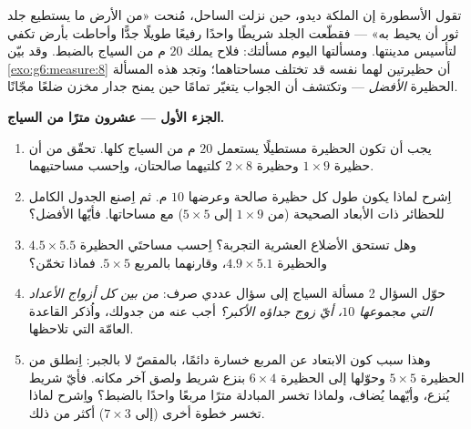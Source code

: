 \begin{problem}
\label{pb:g6:measure:1}
تقول الأسطورة إن الملكة ديدو، حين نزلت الساحل، مُنحت
«من الأرض ما يستطيع جلد ثور أن يحيط به» --- فقطّعت
الجلد شريطًا واحدًا رفيعًا طويلًا جدًّا وأحاطت بأرض
تكفي لتأسيس مدينتها. ومسألتها اليوم مسألتك: فلاح
يملك $20$ م من السياج بالضبط. وقد بيّن \cref{exo:g6:measure:8}
أن حظيرتين لهما  نفسه قد تختلف
مساحتاهما؛ وتجد هذه المسألة الحظيرة \emph{الأفضل} --- وتكتشف
أن الجواب يتغيّر تمامًا حين يمنح جدار مخزن ضلعًا
مجّانًا.

\medskip
\noindent\textbf{الجزء الأول --- عشرون مترًا من السياج.}
\begin{enumerate}
  \item يجب أن تكون الحظيرة مستطيلًا يستعمل $20$ م من السياج كلها.
        تحقّق من أن حظيرة $1 \times 9$ وحظيرة $2 \times 8$ كلتيهما
        صالحتان، واِحسب مساحتيهما.
  \item اِشرح لماذا يكون  طول كل حظيرة صالحة وعرضها
        $10$ م. ثم اِصنع الجدول الكامل للحظائر ذات
        الأبعاد الصحيحة (من $1 \times 9$ إلى $5 \times 5$) مع
        مساحاتها. فأيّها الأفضل؟
  \item وهل تستحق الأضلاع العشرية التجربة؟ اِحسب مساحتَي
        الحظيرة $4.5 \times 5.5$ والحظيرة $4.9 \times 5.1$،
        وقارنهما بالمربع $5 \times 5$. فماذا
        تخمّن؟
  \item حوّل السؤال 2 مسألة السياج إلى سؤال عددي
        صرف: \emph{من بين كل أزواج الأعداد التي مجموعها
        $10$، أيّ زوج جداؤه الأكبر؟} أجب عنه من
        جدولك، واُذكر القاعدة العامّة التي تلاحظها.
  \item وهذا سبب كون الابتعاد عن المربع خسارة دائمًا،
        بالمقصّ لا بالجبر: اِنطلق من
        الحظيرة $5 \times 5$ وحوّلها إلى الحظيرة $6 \times 4$
        بنزع شريط ولصق آخر مكانه. فأيّ
        شريط يُنزع، وأيّهما يُضاف، ولماذا تخسر
        المبادلة مترًا مربعًا واحدًا بالضبط؟ واِشرح لماذا تخسر
        خطوة أخرى (إلى $7 \times 3$) أكثر من ذلك.
\end{enumerate}


\end{problem}
